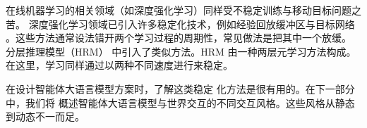 
在线机器学习的相关领域（如深度强化学习）同样受不稳定训练与移动目标问题之苦。
深度强化学习领域已引入许多稳定化技术，例如经验回放缓冲区与目标网络 \citep{mnih2015human,hessel2018rainbow}。这些方法通常设法错开两个学习过程的周期性，常见做法是把其中一个放缓。
分层推理模型（HRM）\citep{wang2025hierarchical} 中引入了类似方法。HRM 由一种两层元学习方法构成。在这里，学习同样通过以两种不同速度进行来稳定。

在设计智能体大语言模型方案时，了解这类稳定
化方法是很有用的。在下一部分中，我们将
概述智能体大语言模型与世界交互的不同交互风格。这些风格从静态到动态不一而足。












